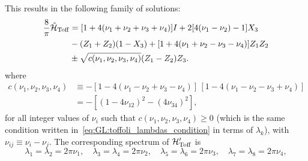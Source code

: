 This results in the following family of solutions:
\begin{equation}
\begin{aligned}
	\frac{8}{\pi}\tilde{{\mathcal{H}}}_{\operatorname{Toff}} &=
	[1 + 4(\nu_1+\nu_2+\nu_3+\nu_4)] I +
	2[4(\nu_1-\nu_2) - 1] X_3 \\
	&- (Z_1 + Z_2)(1 - X_3) +
	[1 + 4(\nu_1+\nu_2-\nu_3-\nu_4)] Z_1 Z_2 \\
	&\pm \sqrt{c(\nu_1,\nu_2,\nu_3,\nu_4)} (Z_1 - Z_2)Z_3.
\end{aligned}
\label{eq:GL:toff_tilde_general_solution}
\end{equation}
where
\begin{equation}
\begin{split}
	c(\nu_1, \nu_2, \nu_3, \nu_4) &\equiv
		-[1 - 4(\nu_1 - \nu_2 + \nu_3 - \nu_4)]
		\, [1 - 4(\nu_1 - \nu_2 - \nu_3 + \nu_4)]\\
		&= -[(1-4\nu_{12})^2-(4\nu_{34})^2],
\end{split}
\end{equation}
for all integer values of $\nu_i$ such that $c(\nu_1, \nu_2, \nu_3, \nu_4) \ge 0$ (which is the same condition written in~\cref{eq:GL:toffoli_lambdas_condition} in terms of $\lambda_k$), with $\nu_{ij}\equiv\nu_i-\nu_j$.
The corresponding spectrum of ${\mathcal{H}}'_{\operatorname{Toff}}$ is
\begin{equation}
	\lambda_1 = \lambda_2 = 2\pi \nu_1, \quad
	\lambda_3 = \lambda_4 = 2\pi \nu_2, \quad
	\lambda_5 = \lambda_6 = 2\pi \nu_3, \quad
	\lambda_7 = \lambda_8 = 2\pi \nu_4, 
\end{equation}

